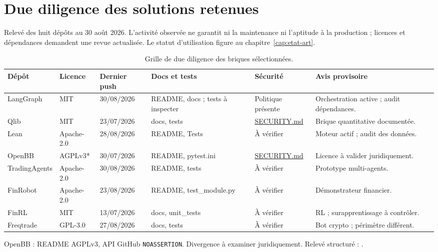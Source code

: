 \chapter{Due diligence des solutions retenues}\label{annexe:github}

Relevé des huit dépôts au 30 août 2026. L'activité observée ne garantit ni la maintenance ni l'aptitude à la production ; licences et dépendances demandent une revue actualisée. Le statut d'utilisation figure au chapitre~\ref{cap:etat-art}.

\begin{table}[H]
\centering
\caption{Grille de due diligence des briques sélectionnées.}
\label{tab:due-diligence}
\scriptsize
\begin{adjustbox}{width=\textwidth}
\begin{tabular}{p{}p{}p{}p{}p{}p{}}
\toprule
\textbf{Dépôt} & \textbf{Licence} & \textbf{Dernier push} & \textbf{Docs et tests} & \textbf{Sécurité} & \textbf{Avis provisoire} \\
\midrule
LangGraph \citep{githubLangGraph} & MIT & 30/08/2026 & README, docs ; tests à inspecter & Politique présente & Orchestration active ; audit dépendances. \\
Qlib \citep{githubQlib} & MIT & 23/07/2026 & docs, tests & \href{https://github.com/microsoft/qlib/blob/main/SECURITY.md}{SECURITY.md} & Brique quantitative documentée. \\
Lean \citep{githubLean} & Apache-2.0 & 28/08/2026 & README, Tests & À vérifier & Moteur actif ; audit des données. \\
OpenBB \citep{githubOpenBB} & AGPLv3* & 30/07/2026 & README, pytest.ini & \href{https://github.com/OpenBB-finance/OpenBB/blob/develop/SECURITY.md}{SECURITY.md} & Licence à valider juridiquement. \\
TradingAgents \citep{githubTradingAgents} & Apache-2.0 & 30/08/2026 & README, tests & À vérifier & Prototype multi-agents. \\
FinRobot \citep{githubFinRobot} & Apache-2.0 & 23/08/2026 & README, test\_module.py & À vérifier & Démonstrateur financier. \\
FinRL \citep{githubFinRL} & MIT & 13/07/2026 & docs, unit\_tests & À vérifier & RL ; surapprentissage à contrôler. \\
Freqtrade \citep{githubFreqtrade} & GPL-3.0 & 27/08/2026 & docs, tests & À vérifier & Bot crypto ; périmètre différent. \\
\bottomrule
\end{tabular}
\end{adjustbox}
\end{table}

\noindent * OpenBB : README AGPLv3, API GitHub \texttt{NOASSERTION}. Divergence à examiner juridiquement. Relevé structuré : .
